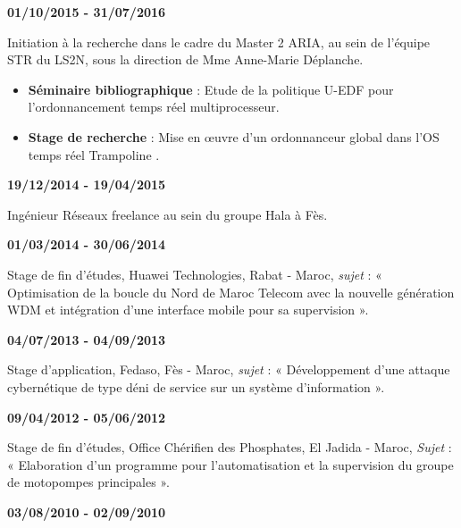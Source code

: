 \hspace{-0.7cm}\textbf{01/10/2015 - 31/07/2016}

		Initiation à la recherche dans le cadre du Master 2 ARIA, au sein de l’équipe STR du LS2N, sous la direction de Mme Anne-Marie Déplanche.
		
		\begin{itemize}[label=-]
			\itemsep0em 
			\item \textbf{Séminaire bibliographique }: Etude de la politique U-EDF \cite{nelissen2012u} pour l’ordonnancement temps réel multiprocesseur.
			
			\item \textbf{Stage de recherche }: Mise en œuvre d’un ordonnanceur global dans l’OS temps
			réel Trampoline \cite{bechennec2006trampoline}.
		\end{itemize}


\hspace{-0.7cm}\textbf{19/12/2014 - 19/04/2015}

	Ingénieur Réseaux freelance au sein du groupe Hala à Fès.

\vspace{0.4cm}


\hspace{-0.7cm}\textbf{01/03/2014 - 30/06/2014}

		Stage de fin d’études, Huawei Technologies, Rabat - Maroc, \textit{sujet} : « Optimisation de la boucle du Nord de Maroc Telecom avec la nouvelle génération WDM et intégration d’une interface mobile pour sa supervision ».

\vspace{0.4cm}
\hspace{-0.7cm}\textbf{04/07/2013 - 04/09/2013}

		Stage d’application, Fedaso, Fès - Maroc, \textit{sujet} : « Développement d’une attaque	cybernétique de type déni de service sur un système d’information ».

\vspace{0.4cm}
\hspace{-0.7cm}\textbf{09/04/2012 - 05/06/2012}

		Stage de fin d’études, Office Chérifien des Phosphates, El Jadida - Maroc, \textit{Sujet} :
		« Elaboration d’un programme pour l’automatisation et la supervision du groupe de
		motopompes principales ».

\vspace{0.4cm}
\hspace{-0.7cm}\textbf{03/08/2010 - 02/09/2010}

